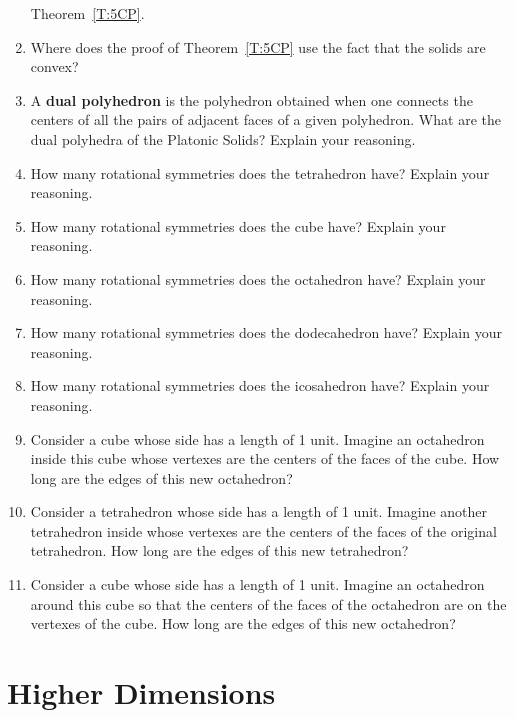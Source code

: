 \begin{enumerate}
  Theorem~\ref{T:5CP}.
\item Where does the proof of Theorem~\ref{T:5CP} use the fact that
  the solids are convex?
\item A \textbf{dual polyhedron} is the
  polyhedron obtained when one connects the centers of all the pairs
  of adjacent faces of a given polyhedron. What are the dual polyhedra
  of the Platonic Solids? Explain your reasoning.
\item How many rotational symmetries does the tetrahedron have?
  Explain your reasoning.
\item How many rotational symmetries does the cube have?
  Explain your reasoning.
\item How many rotational symmetries does the octahedron have?
  Explain your reasoning.
\item How many rotational symmetries does the dodecahedron have?
  Explain your reasoning.
\item How many rotational symmetries does the icosahedron have?
  Explain your reasoning.
\item Consider a cube whose side has a length of 1 unit. Imagine an
  octahedron inside this cube whose vertexes are the centers of the
  faces of the cube. How long are the edges of this new octahedron?
\item Consider a tetrahedron whose side has a length of 1
  unit. Imagine another tetrahedron inside whose vertexes are the
  centers of the faces of the original tetrahedron. How long are the
  edges of this new tetrahedron?
\item Consider a cube whose side has a length of 1 unit. Imagine an
  octahedron around this cube so that the centers of the faces of the
  octahedron are on the vertexes of the cube. How long are the edges
  of this new octahedron?
\end{enumerate}



\newpage


\section{Higher Dimensions}


